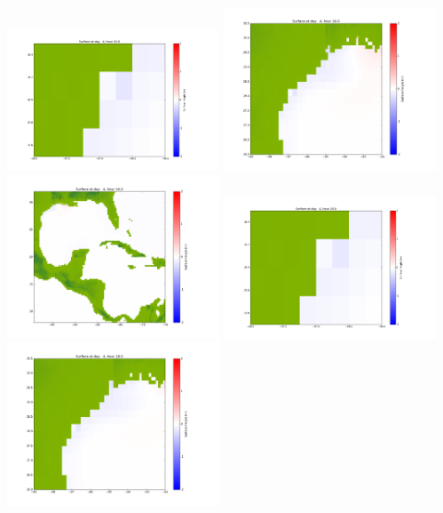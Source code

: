 \documentclass[11pt]{article}
\begin{document}
\vskip 10pt 
\includegraphics[width=0.475\textwidth]{frame0080fig1001.png}
\includegraphics[width=0.475\textwidth]{frame0080fig1002.png}
\vskip 10pt 
\includegraphics[width=0.475\textwidth]{frame0080fig1003.png}
\vskip 10pt 
\includegraphics[width=0.475\textwidth]{frame0081fig1001.png}
\includegraphics[width=0.475\textwidth]{frame0081fig1002.png}
\end{document}
